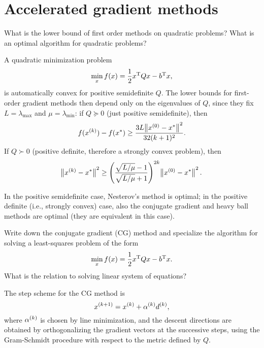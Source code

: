 \documentclass{article}
\begin{document}
\section{Accelerated gradient methods}

\begin{question}
  What is the lower bound of first order methods on quadratic problems?  What is an optimal
  algorithm for quadratic problems?
\end{question}

A quadratic minimization problem
\begin{equation*}
  \min_x f(x) = \frac{1}{2} \T{x} Q x - \T{b}x,
\end{equation*}
is automatically convex for positive semidefinite \(Q\).  The lower bounds for first-order gradient
methods then depend only on the eigenvalues of \(Q\), since they fix \(L = \lambda_{\text{max}}\)
and \(\mu = \lambda_{\text{min}}\): if \(Q \succeq 0\) (just positive semidefinite), then
\begin{equation*}
  f(\kth{x}) - f(x^*) \geq \frac{3L \enVert[1]{\kth[0]{x} - x^*}^2}{32(k+1)^2}.
\end{equation*}
If \(Q \succ 0\) (positive definite, therefore a strongly convex problem), then
\begin{equation*}
  \enVert[1]{\kth{x} - x^*}^2
  \geq \left( \frac{\sqrt{L/\mu} - 1}{\sqrt{L/\mu} + 1} \right)^{2k} \enVert[1]{\kth[0]{x} - x^*}^2.
\end{equation*}

In the positive semidefinite case, Nesterov's method is optimal; in the positive definite (i.e.,
strongly convex) case, also the conjugate gradient and heavy ball methods are optimal (they are
equivalent in this case).

\begin{question}
  Write down the conjugate gradient (CG) method and specialize the algorithm for solving a
  least-squares problem of the form
  \[
    \min_x f(x) = \frac{1}{2} \T{x} Q x - \T{b} x.
  \]
  What is the relation to solving linear system of equations?
\end{question}

The step scheme for the CG method is
\begin{equation*}
  \kth[k+1]{x} = \kth{x} + \kth{\alpha}\kth{d},
\end{equation*}
where \(\kth{\alpha}\) is chosen by line minimization, and the descent directions are obtained by
orthogonalizing the gradient vectors at the successive steps, using the Gram-Schmidt procedure with
respect to the metric defined by \(Q\).
\end{document}
